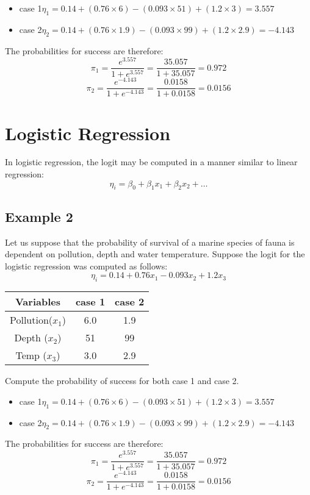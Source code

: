 \documentclass[12pt]{article}
\begin{document}
\begin{itemize}
	\item case 1$ \eta_1 = 0.14 + (0.76 \times 6)	- (0.093\times 51) + (1.2\times 3) = 3.557$
	\item case 2$ \eta_2 = 0.14 + (0.76 \times 1.9)	- (0.093\times 99) + (1.2\times 2.9) = -4.143$
\end{itemize}

The probabilities for success are therefore:
\[ \pi_1  =  \frac{e^{3.557}}{1 + e^{3.557}} = \frac{35.057}{1 + 35.057} = 0.972 \]
\[ \pi_2  =  \frac{e^{-4.143}}{1 + e^{-4.143}} = \frac{0.0158}{1 + 0.0158} = 0.0156 \]


\section{Logistic Regression}
In logistic regression, the logit may be computed in a manner similar to linear regression:
\[ \eta_i = \beta_0 + \beta_1x_1 + \beta_2x_2 + \ldots  \]

\subsection{Example 2}
Let us suppose that the probability of survival of a marine species of fauna is dependent on pollution, depth and water temperature. Suppose the logit for the logistic regression was computed as follows:
\[ \eta_i = 0.14 + 0.76x_1 - 0.093x_2 + 1.2x_3  \]
\begin{center}
	\begin{tabular}{|c|c|c|}
		\hline
		Variables & case 1 & case 2 \\ \hline
		Pollution($x_1$) & 6.0 & 1.9 \\
		Depth ($x_2$)& 51 & 99 \\
		Temp ($x_3$) & 3.0 & 2.9 \\
		\hline
	\end{tabular}
\end{center}
Compute the probability of success for both case 1 and case 2.

\begin{itemize}
	\item case 1$ \eta_1 = 0.14 + (0.76 \times 6)	- (0.093\times 51) + (1.2\times 3) = 3.557$
	\item case 2$ \eta_2 = 0.14 + (0.76 \times 1.9)	- (0.093\times 99) + (1.2\times 2.9) = -4.143$
\end{itemize}

The probabilities for success are therefore:
\[ \pi_1  =  \frac{e^{3.557}}{1 + e^{3.557}} = \frac{35.057}{1 + 35.057} = 0.972 \]
\[ \pi_2  =  \frac{e^{-4.143}}{1 + e^{-4.143}} = \frac{0.0158}{1 + 0.0158} = 0.0156 \]
\end{document}

